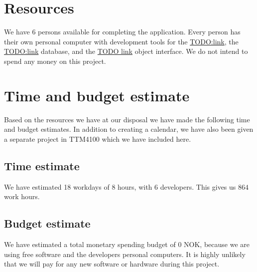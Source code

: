 \documentclass[a4paper, english, 12pt]{article}
\begin{document}

\section{Resources}
We have 6 persons available for completing the application. Every person has their own personal computer with 
development tools for the \href{java runtime environment}{TODO:link}, the \href{PostgreSQL}{TODO:link} database, 
and the \href{JSON}{TODO link} object interface.
We do not intend to spend any money on this project. 

\section{Time and budget estimate}
Based on the resources we have at our disposal we have made the following time and budget estimates. In addition to creating a calendar, we have also been given a separate project in TTM4100 which we have included here.
\subsection{Time estimate}
We have estimated 18 workdays of 8 hours, with 6 developers. This gives us $864$ work hours.


\subsection{Budget estimate}
We have estimated a total monetary spending budget of 0 NOK, because we are using free software and the developers personal computers. It is highly unlikely that we will pay for any new software or hardware during this project. 
\end{document}
